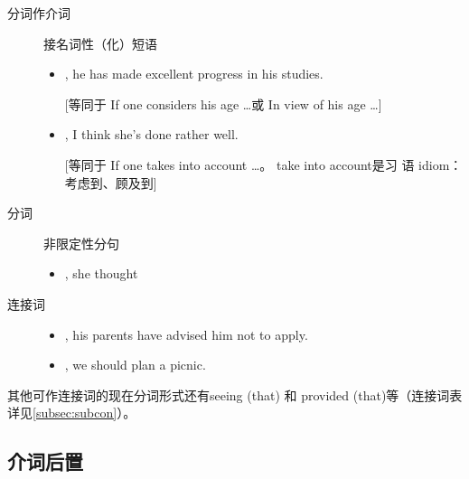 \begin{description}
\item[分词作介词] 接名词性（化）短语
  \begin{itemize}
  \item {}, he has made excellent progress in his studies.

    [等同于 If one considers his age \ldots 或 In view of his age \ldots{}]

  \item {}, I think she's done rather well.

    [等同于 If one takes into account \ldots{}。 take into account是习
    语 idiom：考虑到、顾及到]
  \end{itemize}

\item[分词] 非限定性分句
  \begin{itemize}
  \item {}, she thought
  \end{itemize}

\item[连接词]
  \begin{itemize}
  \item {}, his parents have advised
    him not to apply.

  \item {}, we should
    plan a picnic.
  \end{itemize}
\end{description}

其他可作连接词的现在分词形式还有seeing (that) 和 provided (that)等（连接词表详见\cref{subsec:subcon}）。


\subsection{介词后置}

